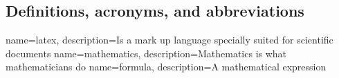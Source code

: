 \subsection{Definitions, acronyms, and abbreviations}
{
        name=latex,
        description={Is a mark up language specially suited for scientific documents}
}
{
        name=mathematics,
        description={Mathematics is what mathematicians do}
}
{
        name=formula,
        description={A mathematical expression}
}


\printglossary[type=\acronymtype]

\printglossary
{}
